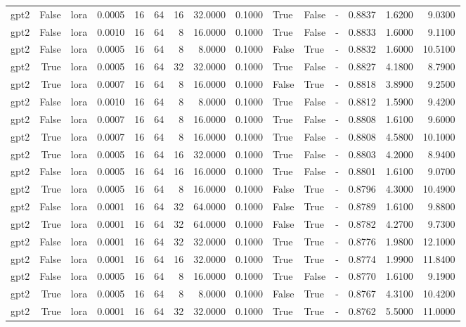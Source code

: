 \begin{tabular}{lrlrrrrrrlllrrr}
gpt2 & False & lora & 0.0005 & 16 & 64 & 16 & 32.0000 & 0.1000 & True & False & - & 0.8837 & 1.6200 & 9.0300 \\
gpt2 & False & lora & 0.0010 & 16 & 64 & 8 & 16.0000 & 0.1000 & True & False & - & 0.8833 & 1.6000 & 9.1100 \\
gpt2 & False & lora & 0.0005 & 16 & 64 & 8 & 8.0000 & 0.1000 & False & True & - & 0.8832 & 1.6000 & 10.5100 \\
gpt2 & True & lora & 0.0005 & 16 & 64 & 32 & 32.0000 & 0.1000 & True & False & - & 0.8827 & 4.1800 & 8.7900 \\
gpt2 & True & lora & 0.0007 & 16 & 64 & 8 & 16.0000 & 0.1000 & False & True & - & 0.8818 & 3.8900 & 9.2500 \\
gpt2 & False & lora & 0.0010 & 16 & 64 & 8 & 8.0000 & 0.1000 & True & False & - & 0.8812 & 1.5900 & 9.4200 \\
gpt2 & False & lora & 0.0007 & 16 & 64 & 8 & 16.0000 & 0.1000 & True & False & - & 0.8808 & 1.6100 & 9.6000 \\
gpt2 & True & lora & 0.0007 & 16 & 64 & 8 & 16.0000 & 0.1000 & True & False & - & 0.8808 & 4.5800 & 10.1000 \\
gpt2 & True & lora & 0.0005 & 16 & 64 & 16 & 32.0000 & 0.1000 & True & False & - & 0.8803 & 4.2000 & 8.9400 \\
gpt2 & False & lora & 0.0005 & 16 & 64 & 16 & 16.0000 & 0.1000 & True & False & - & 0.8801 & 1.6100 & 9.0700 \\
gpt2 & True & lora & 0.0005 & 16 & 64 & 8 & 16.0000 & 0.1000 & False & True & - & 0.8796 & 4.3000 & 10.4900 \\
gpt2 & False & lora & 0.0001 & 16 & 64 & 32 & 64.0000 & 0.1000 & False & True & - & 0.8789 & 1.6100 & 9.8800 \\
gpt2 & True & lora & 0.0001 & 16 & 64 & 32 & 64.0000 & 0.1000 & False & True & - & 0.8782 & 4.2700 & 9.7300 \\
gpt2 & False & lora & 0.0001 & 16 & 64 & 32 & 32.0000 & 0.1000 & True & True & - & 0.8776 & 1.9800 & 12.1000 \\
gpt2 & False & lora & 0.0001 & 16 & 64 & 16 & 32.0000 & 0.1000 & True & True & - & 0.8774 & 1.9900 & 11.8400 \\
gpt2 & False & lora & 0.0005 & 16 & 64 & 8 & 16.0000 & 0.1000 & True & False & - & 0.8770 & 1.6100 & 9.1900 \\
gpt2 & True & lora & 0.0005 & 16 & 64 & 8 & 8.0000 & 0.1000 & False & True & - & 0.8767 & 4.3100 & 10.4200 \\
gpt2 & True & lora & 0.0001 & 16 & 64 & 32 & 32.0000 & 0.1000 & True & True & - & 0.8762 & 5.5000 & 11.0000 \\

\end{tabular}
